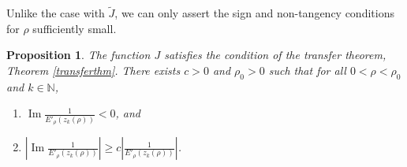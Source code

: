 \documentclass{amsart}
\theoremstyle{plain}
\numberwithin{theorem}{section}
\newtheorem{prop}[theorem]{Proposition}
\DeclareMathOperator{\Imz}{Im}
\theoremstyle{definition}
\theoremstyle{remark}
\theoremstyle{brakets}
\newcommand{\N}{\mathbb{N}}
\begin{document}
Unlike the case with $\tilde{J}$, we can only assert the sign and non-tangency conditions for $\rho$ sufficiently small.

\begin{prop}\label{jtransferthm}
The function $J$ satisfies the condition of the transfer theorem, Theorem \ref{transferthm}. There exists $c > 0$ and $\rho_0 > 0$ such that for all $0 < \rho < \rho_0$ and $k \in \N$,
\begin{enumerate}
    \item $\Imz \frac{1}{E'_\rho(z_k(\rho))} < 0$, and
    \item $\left| \Imz \frac{1}{E'_\rho(z_k(\rho))} \right| \geq c\left| \frac{1}{E'_\rho(z_k(\rho))} \right|$.
\end{enumerate}  
\end{prop}
\end{document}
